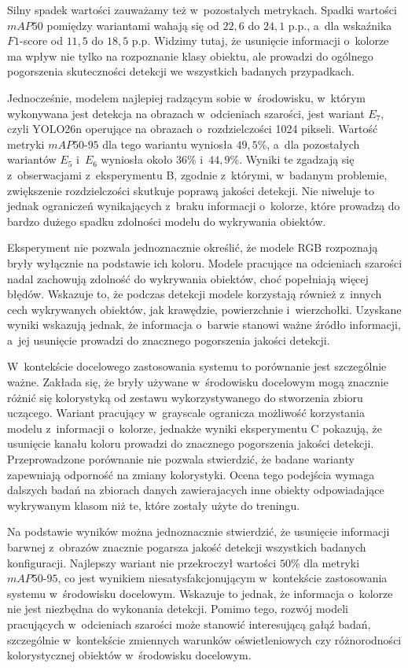 Silny spadek wartości zauważamy też w~pozostałych metrykach. Spadki wartości $mAP50$ pomiędzy wariantami wahają się od $22,6$ do $24,1$ p.p., a~dla wskaźnika $F1$-score od $11,5$ do $18,5$ p.p. Widzimy tutaj, że usunięcie informacji o~kolorze ma wpływ nie tylko na rozpoznanie klasy obiektu, ale prowadzi do ogólnego pogorszenia skuteczności detekcji we wszystkich badanych przypadkach.

Jednocześnie, modelem najlepiej radzącym sobie w~środowisku, w~którym wykonywana jest detekcja na obrazach w~odcieniach szarości, jest wariant $E_7$, czyli YOLO26n operujące na obrazach o~rozdzielczości 1024 pikseli. Wartość metryki $mAP50\text{-}95$ dla tego wariantu wyniosła $49,5\%$, a~dla pozostałych wariantów $E_5$ i~$E_6$ wyniosła około $36\%$ i~$44,9\%$. Wyniki te zgadzają się z~obserwacjami z~eksperymentu B, zgodnie z~którymi, w~badanym problemie, zwiększenie rozdzielczości skutkuje poprawą jakości detekcji. Nie niweluje to jednak ograniczeń wynikających z~braku informacji o~kolorze, które prowadzą do bardzo dużego spadku zdolności modelu do wykrywania obiektów.

Eksperyment nie pozwala jednoznacznie określić, że modele RGB rozpoznają bryły wyłącznie na podstawie ich koloru. Modele pracujące na odcieniach szarości nadal zachowują zdolność do wykrywania obiektów, choć popełniają więcej błędów. Wskazuje to, że podczas detekcji modele korzystają również z~innych cech wykrywanych obiektów, jak krawędzie, powierzchnie i~wierzchołki. Uzyskane wyniki wskazują jednak, że informacja o~barwie stanowi ważne źródło informacji, a~jej usunięcie prowadzi do znacznego pogorszenia jakości detekcji.

W~kontekście docelowego zastosowania systemu to porównanie jest szczególnie ważne. Zakłada się, że bryły używane w~środowisku docelowym mogą znacznie różnić się kolorystyką od zestawu wykorzystywanego do stworzenia zbioru uczącego. Wariant pracujący w~grayscale ogranicza możliwość korzystania modelu z~informacji o~kolorze, jednakże wyniki eksperymentu C pokazują, że usunięcie kanału koloru prowadzi do znacznego pogorszenia jakości detekcji. Przeprowadzone porównanie nie pozwala stwierdzić, że badane warianty zapewniają odporność na zmiany kolorystyki. Ocena tego podejścia wymaga dalszych badań na zbiorach danych zawierajacych inne obiekty odpowiadające wykrywanym klasom niż te, które zostały użyte do treningu.

Na podstawie wyników można jednoznacznie stwierdzić, że usunięcie informacji barwnej z~obrazów znacznie pogarsza jakość detekcji wszystkich badanych konfiguracji. Najlepszy wariant nie przekroczył wartości $50\%$ dla metryki $mAP50\text{-}95$, co jest wynikiem niesatysfakcjonującym w~kontekście zastosowania systemu w~środowisku docelowym. Wskazuje to jednak, że informacja o~kolorze nie jest niezbędna do wykonania detekcji. Pomimo tego, rozwój modeli pracujących w~odcieniach szarości może stanowić interesującą gałąź badań, szczególnie w~kontekście zmiennych warunków oświetleniowych czy różnorodności kolorystycznej obiektów w~środowisku docelowym.

